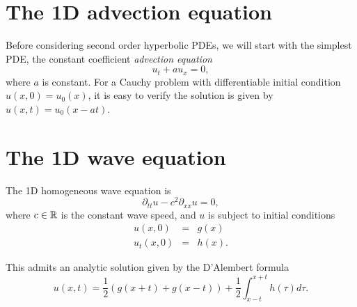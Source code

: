 
\section{The 1D advection equation}
Before considering second order hyperbolic PDEs, we will start with the simplest PDE, the constant coefficient \textit{advection equation}
\begin{equation}
\label{eq:advection}
u_t+ a u_x = 0,
\end{equation}
where $a$ is constant. For a Cauchy problem with differentiable initial condition $u(x,0)=u_0(x)$, it is easy to verify the solution is given by $u(x,t)=u_0(x-at)$. 



\section{The 1D wave equation}
The 1D homogeneous wave equation is 
\begin{equation}\label{eq:1Dwave}
\partial_{tt} u-c^2 \partial_{xx} u = 0,
\end{equation}
where $c\in \mathbb{R}$ is the constant wave speed, and $u$ is subject to initial conditions
\begin{eqnarray}%
u(x,0) & = & g(x) \\
u_t(x,0) & = & h(x). 
\end{eqnarray}


This admits an analytic solution
%
given by the D'Alembert formula
\begin{equation}
u(x,t)=\frac{1}{2}(g(x+t)+g(x-t))+\frac{1}{2}\int_{x-t}^{x+t} h(\tau) d\tau.
\label{eq:dAlembert}
\end{equation}

